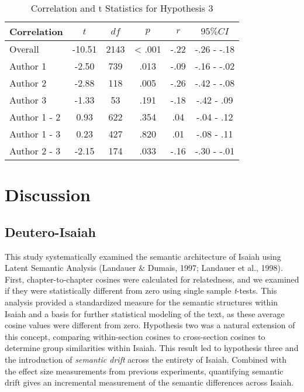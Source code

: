 \documentclass[english,man]{apa6}
\theoremstyle{definition}
\theoremstyle{definition}
\theoremstyle{definition}
\theoremstyle{remark}
\begin{document}
\begin{table}[tbp]
\begin{center}
\begin{threeparttable}
\caption{\label{tab:drift-analysis}Correlation and t Statistics for Hypothesis 3}
\begin{tabular}{lccccc}
\toprule
Correlation & $t$ & $df$ & $p$ & $r$ & $95\% CI$\\
\midrule
Overall & -10.51 & 2143 & < .001 & -.22 & -.26  -  -.18\\
Author 1 & -2.50 & 739 & .013 & -.09 & -.16  -  -.02\\
Author 2 & -2.88 & 118 & .005 & -.26 & -.42  -  -.08\\
Author 3 & -1.33 & 53 & .191 & -.18 & -.42  -  .09\\
Author 1 - 2 & 0.93 & 622 & .354 & .04 & -.04  -  .12\\
Author 1 - 3 & 0.23 & 427 & .820 & .01 & -.08  -  .11\\
Author 2 - 3 & -2.15 & 174 & .033 & -.16 & -.30  -  -.01\\
\bottomrule
\end{tabular}
\end{threeparttable}
\end{center}
\end{table}

\section{Discussion}\label{discussion}

\subsection{Deutero-Isaiah}\label{deutero-isaiah}

This study systematically examined the semantic architecture of Isaiah
using Latent Semantic Analysis (Landauer \& Dumais, 1997; Landauer et
al., 1998). First, chapter-to-chapter cosines were calculated for
relatedness, and we examined if they were statistically different from
zero using single sample \emph{t}-tests. This analysis provided a
standardized measure for the semantic structures within Isaiah and a
basis for further statistical modeling of the text, as these average
cosine values were different from zero. Hypothesis two was a natural
extension of this concept, comparing within-section cosines to
cross-section cosines to determine group similarities within Isaiah.
This result led to hypothesis three and the introduction of
\emph{semantic drift} across the entirety of Isaiah. Combined with the
effect size measurements from previous experiments, quantifying semantic
drift gives an incremental measurement of the semantic differences
across Isaiah.
\end{document}
